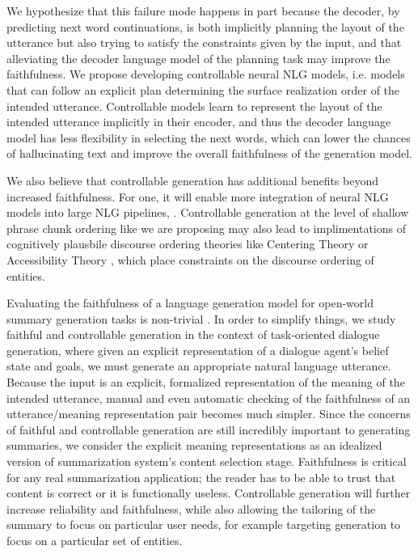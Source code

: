 We hypothesize that this failure mode happens in part because the decoder, by
predicting next word continuations, is both implicitly planning the layout of
the utterance but also trying to satisfy the constraints given by the input,
and that alleviating the decoder language model of the planning task may
improve the faithfulness.  We propose developing controllable neural NLG
models, i.e. models that can follow an explicit plan determining  the surface
realization order of the intended utterance.  Controllable models learn to
represent the layout of the intended utterance implicitly in their encoder,
and thus the decoder language model has less flexibility in selecting the next
words, which can lower the chances of hallucinating text and improve the
overall faithfulness of the generation model.

We also believe that controllable generation has additional benefits beyond
increased faithfulness. For one, it will enable more integration of neural NLG
models into large NLG pipelines, \citep{castroferreira2019}.  Controllable
generation at the level of shallow phrase chunk ordering like we are proposing
may also lead to implimentations of cognitively plausbile discourse ordering
theories like Centering Theory \citep{grosz1995} or Accessibility Theory
\citep{ariel2001}, which place constraints on the discourse ordering of
entities.

Evaluating the faithfulness of a language generation model for open-world
summary generation tasks is non-trivial \citep{kryscinski2020,maynez2020}. In
order to simplify things, we study faithful and controllable generation in the
context of task-oriented dialogue generation, where given an explicit
representation of a dialogue agent's belief state and goals, we must generate
an appropriate natural language utterance. Because the input is an explicit,
formalized representation of the meaning of the intended utterance, manual and
even automatic checking of the faithfulness of an utterance/meaning
representation pair becomes much simpler. Since the concerns of faithful and
controllable generation are still incredibly important to generating
summaries, we consider the explicit meaning representations as an idealized
version of summarization system's content selection stage.  Faithfulness is
critical for any real summarization application; the reader has to be able to
trust that content is correct or it is functionally useless. Controllable
generation will further increase reliability and faithfulness, while also
allowing the tailoring of the summary to focus on particular user needs, for
example targeting generation to focus on a particular set of entities. 
      
